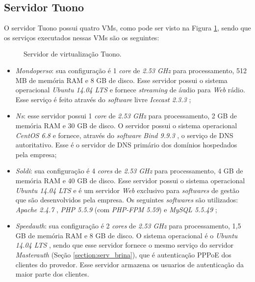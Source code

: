 \subsection{Servidor Tuono}
\label{section:serv_tuono}

O servidor Tuono possui quatro \ac{VM}s, como pode ser visto na Figura \ref{fig:servidor_tuono}, sendo que os serviços executados nessas \ac{VM}s
são os seguintes:

\begin{figure}[h!]
 \centering
 \caption{Servidor de virtualização Tuono.}
 \label{fig:servidor_tuono}
\end{figure}

\begin{itemize}
 \item \textit{Mondoperso}: sua configuração é 1 \textit{core} de \textit{2.53 GHz} para processamento, 512 MB de memória RAM e 8 GB de disco. 
 Esse servidor possui o sistema operacional \textit{Ubuntu 14.04 \ac{LTS}} \cite{ubuntu} e fornece \textit{streaming} de áudio para \textit{Web} 
 rádio. Esse serviço é feito através do \textit{software} livre \textit{Icecast 2.3.3} \cite{icecast};
 
 \item \textit{Ns}: esse servidor possui 1 \textit{core} de \textit{2.53 GHz} para processamento, 2 GB de memória RAM e 30 GB de disco. O servidor possui o sistema 
 operacional \textit{CentOS 6.8} \cite{centos} e fornece, através do \textit{software} \textit{Bind 9.9.3} \cite{bind}, o serviço de \ac{DNS} 
 autoritativo. Esse é o servidor de \ac{DNS} primário dos domínios hospedados pela empresa;

 \item \textit{Soldi}: sua configuração é 4 \textit{cores} de \textit{2.53 GHz} para processamento, 4 GB de memória RAM e 40 GB de disco. 
 Esse servidor possui o sistema operacional \textit{Ubuntu 14.04 \ac{LTS}} \cite{ubuntu} e é um servidor \textit{Web} exclusivo para 
 \textit{softwares} de gestão que são desenvolvidos pela empresa. Os seguintes \textit{softwares} são utilizados: \textit{Apache 2.4.7} 
 \cite{apache}, \textit{\ac{PHP} 5.5.9} \cite{php} (com \textit{PHP-FPM 5.59}) e \textit{MySQL 5.5.49} \cite{mysql};

 \item \textit{Speedauth}: sua configuração é 2 \textit{cores} de \textit{2.53 GHz} para processamento, 1,5 GB de memória RAM e 8 GB de disco. 
 O sistema operacional é o \textit{Ubuntu 14.04 \ac{LTS}} \cite{ubuntu}, sendo que esse servidor fornece o mesmo serviço do servidor 
 \textit{Masterauth} (Seção \ref{section:serv_brina}), que é autenticação \ac{PPPoE} dos clientes do provedor. Esse servidor armazena os usuarios 
 de autenticação da maior parte dos clientes.
\end{itemize}

